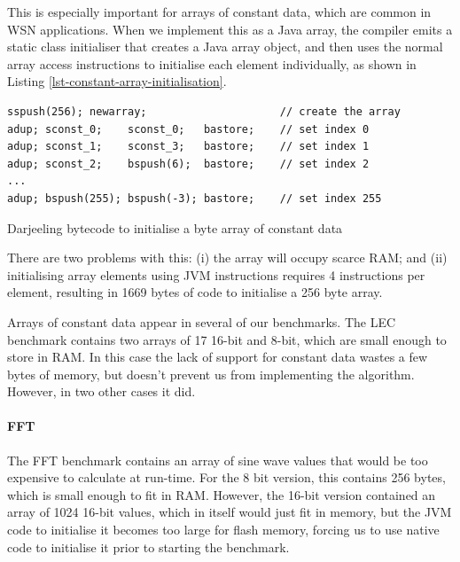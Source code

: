 This is especially important for arrays of constant data, which are common in WSN applications. When we implement this as a  Java array, the compiler emits a static class initialiser that creates a Java array object, and then uses the normal array access instructions to initialise each element individually, as shown in Listing \ref{lst-constant-array-initialisation}.

\begin{listing}
	\centering
	\begin{verbatim}
sspush(256); newarray;                     // create the array
adup; sconst_0;    sconst_0;   bastore;    // set index 0
adup; sconst_1;    sconst_3;   bastore;    // set index 1
adup; sconst_2;    bspush(6);  bastore;    // set index 2
...
adup; bspush(255); bspush(-3); bastore;    // set index 255
	\end{verbatim}
\caption{Darjeeling bytecode to initialise a byte array of constant data}
\label{lst-constant-array-initialisation}
\end{listing}


There are two problems with this: (i) the array will occupy scarce RAM; and (ii) initialising array elements using JVM instructions requires 4 instructions per element, resulting in 1669 bytes of code to initialise a 256 byte array.

Arrays of constant data appear in several of our benchmarks. The LEC benchmark contains two arrays of 17 16-bit and 8-bit, which are small enough to store in RAM. In this case the lack of support for constant data wastes a few bytes of memory, but doesn't prevent us from implementing the algorithm. However, in two other cases it did.


\paragraph{FFT}
The FFT benchmark contains an array of sine wave values that would be too expensive to calculate at run-time. For the 8 bit version, this contains 256 bytes, which is small enough to fit in RAM. However, the 16-bit version contained an array of 1024 16-bit values, which in itself would just fit in memory, but the JVM code to initialise it becomes too large for flash memory, forcing us to use native code to initialise it prior to starting the benchmark.

